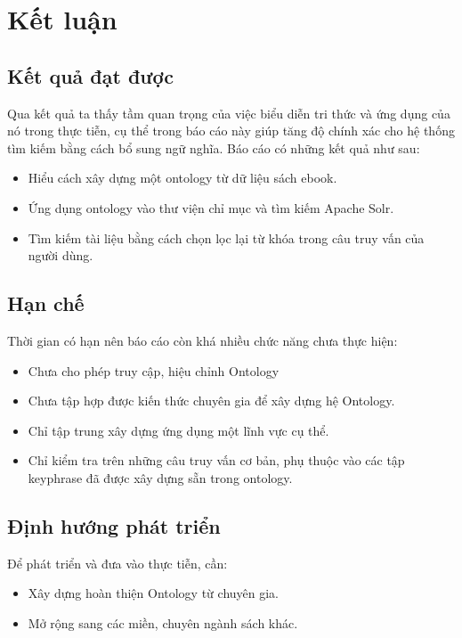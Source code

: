 \chapter{Kết luận}

\section{Kết quả đạt được}

Qua kết quả ta thấy tầm quan trọng của việc biểu diễn tri thức và ứng dụng của nó trong thực tiễn, cụ thể trong báo cáo này giúp tăng độ chính xác cho hệ thống tìm kiếm bằng cách bổ sung ngữ nghĩa. Báo cáo có những kết quả như sau:

\begin{itemize}
    \item Hiểu cách xây dựng một ontology từ dữ liệu sách ebook.
    \item Ứng dụng ontology vào thư viện chỉ mục và tìm kiếm Apache Solr.
    \item Tìm kiếm tài liệu bằng cách chọn lọc lại từ khóa trong câu truy vấn của người dùng.
\end{itemize}

\section{Hạn chế}

Thời gian có hạn nên báo cáo còn khá nhiều chức năng chưa thực hiện:
\begin{itemize}
    \item Chưa cho phép truy cập, hiệu chỉnh Ontology
    \item Chưa tập hợp được kiến thức chuyên gia để xây dựng hệ Ontology.
    \item Chỉ tập trung xây dựng ứng dụng một lĩnh vực cụ thể.
    \item Chỉ kiểm tra trên những câu truy vấn cơ bản, phụ thuộc vào các tập keyphrase đã được xây dựng sẵn trong ontology.
\end{itemize}

\section{Định hướng phát triển}

Để phát triển và đưa vào thực tiễn, cần:
\begin{itemize}
    \item Xây dựng hoàn thiện Ontology từ chuyên gia.
    \item Mở rộng sang các miền, chuyên ngành sách khác.
\end{itemize}